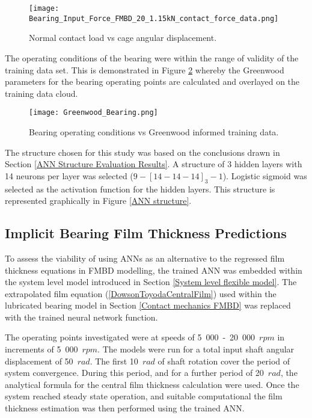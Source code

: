 \begin{figure}
	\centering
	\texttt{[image: Bearing\_Input\_Force\_FMBD\_20\_1.15kN\_contact\_force\_data.png]}
	\caption{Normal contact load vs cage angular displacement.}
	\label{Contact Normal Load ANN}
\end{figure}

The operating conditions of the bearing were within the range of validity of the training data set. This is demonstrated in Figure \ref{Greenwood_Bearing} whereby the Greenwood parameters for the bearing operating points are calculated and overlayed on the training data cloud.

\begin{figure}
	\centering  
	\texttt{[image: Greenwood\_Bearing.png]}
	\caption{Bearing operating conditions vs Greenwood informed training data.}
	\label{Greenwood_Bearing}
\end{figure} 

The structure chosen for this study was based on the conclusions drawn in Section \ref{ANN Structure Evaluation Results}. A structure of 3 hidden layers with 14 neurons per layer was selected ($9-[14-14-14]_3-1$). Logistic sigmoid was selected as the activation function for the hidden layers. This structure is represented graphically in Figure \ref{ANN structure}.


\subsection{Implicit Bearing Film Thickness Predictions}

To assess the viability of using ANNs as an alternative to the regressed film thickness equations in FMBD modelling, the trained ANN was embedded within the system level model introduced in Section \ref{System level flexible model}. The extrapolated film equation (\ref{DowsonToyodaCentralFilm}) used within the lubricated bearing model in Section \ref{Contact mechanics FMBD} was replaced with the trained neural network function.

The operating points investigated were at speeds of 5~000~-~20~000~$rpm$ in increments of 5~000~$rpm$. The models were run for a total input shaft angular displacement of 50~$rad$. The first 10~$rad$ of shaft rotation cover the period of system convergence. During this period, and for a further period of 20~$rad$, the analytical formula for the central film thickness calculation were used. Once the system reached steady state operation, and suitable computational the film thickness estimation was then performed using the trained ANN. 

